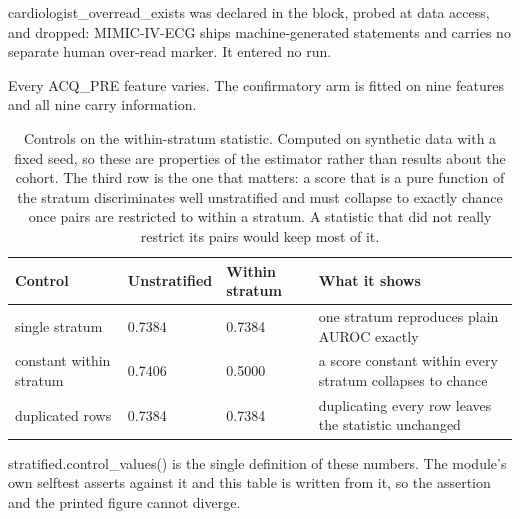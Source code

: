 \begin{table}[t]
\par\footnotesize cardiologist\_overread\_exists was declared in the block, probed at data access, and dropped: MIMIC-IV-ECG ships machine-generated statements and carries no separate human over-read marker. It entered no run.
\par\footnotesize Every ACQ\_PRE feature varies. The confirmatory arm is fitted on nine features and all nine carry information.
\end{table}

\begin{table}[t]
\centering
\small
\caption{Controls on the within-stratum statistic. Computed on synthetic data with a fixed seed, so these are properties of the estimator rather than results about the cohort. The third row is the one that matters: a score that is a pure function of the stratum discriminates well unstratified and must collapse to exactly chance once pairs are restricted to within a stratum. A statistic that did not really restrict its pairs would keep most of it.}
\label{tab:control}
\begin{tabular}{llll}
\toprule
Control & Unstratified & Within stratum & What it shows \\
\midrule
single stratum & 0.7384 & 0.7384 & one stratum reproduces plain AUROC exactly \\
constant within stratum & 0.7406 & 0.5000 & a score constant within every stratum collapses to chance \\
duplicated rows & 0.7384 & 0.7384 & duplicating every row leaves the statistic unchanged \\
\bottomrule
\end{tabular}
\par\footnotesize stratified.control\_values() is the single definition of these numbers. The module's own selftest asserts against it and this table is written from it, so the assertion and the printed figure cannot diverge.
\end{table}

